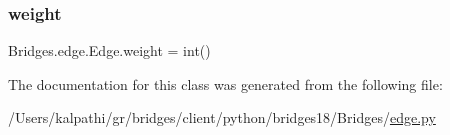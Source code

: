 \mbox{\label{class_bridges_1_1edge_1_1_edge_a36787799fbbb1cd17fe1944d92513524}} 
\subsubsection{\texorpdfstring{weight}{weight}}
{\footnotesize\ttfamily Bridges.\+edge.\+Edge.\+weight = int()\hspace{0.3cm}{\ttfamily [static]}}



The documentation for this class was generated from the following file\+:\begin{DoxyCompactItemize}
\item 
/\+Users/kalpathi/gr/bridges/client/python/bridges18/\+Bridges/\mbox{\hyperlink{edge_8py}{edge.\+py}}\end{DoxyCompactItemize}
